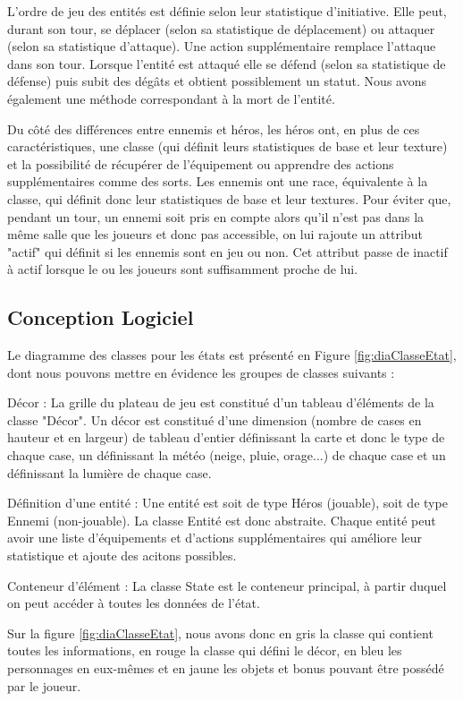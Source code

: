 \documentclass[a4paper,12pt]{article}
\begin{document}
L'ordre de jeu des entités est définie selon leur statistique d'initiative. Elle peut, durant son tour, se déplacer (selon sa statistique de déplacement) ou attaquer (selon sa statistique d'attaque). Une action supplémentaire remplace l'attaque dans son tour. Lorsque l'entité est attaqué elle se défend (selon sa statistique de défense) puis subit des dégâts et obtient possiblement un statut. Nous avons également une méthode correspondant à la mort de l'entité.

Du côté des différences entre ennemis et héros, les héros ont, en plus de ces caractéristiques, une classe (qui définit leurs statistiques de base et leur texture) et la possibilité de récupérer de l'équipement ou apprendre des actions supplémentaires comme des sorts. Les ennemis ont une race, équivalente à la classe, qui définit donc leur statistiques de base et leur textures. Pour éviter que, pendant un tour, un ennemi soit pris en compte alors qu'il n'est pas dans la même salle que les joueurs et donc pas accessible, on lui rajoute un attribut "actif" qui définit si les ennemis sont en jeu ou non. Cet attribut passe de inactif à actif lorsque le ou les joueurs sont suffisamment proche de lui.


\subsection{Conception Logiciel}

Le diagramme des classes pour les états est présenté en Figure \ref{fig:diaClasseEtat}, dont nous pouvons mettre en évidence les groupes de classes suivants :

Décor : La grille du plateau de jeu est constitué d'un tableau d'éléments de la classe "Décor". Un décor est constitué d'une dimension (nombre de cases en hauteur et en largeur) de tableau d'entier définissant la carte et donc le type de chaque case, un définissant la météo (neige, pluie, orage...) de chaque case et un définissant la lumière de chaque case.

Définition d'une entité : Une entité est soit de type Héros (jouable), soit de type Ennemi (non-jouable). La classe Entité est donc abstraite. Chaque entité peut avoir une liste d'équipements et d'actions supplémentaires qui améliore leur statistique et ajoute des acitons possibles.

Conteneur d’élément :  La classe State est le conteneur principal, à partir duquel on peut accéder à toutes les données de l’état.

Sur la figure \ref{fig:diaClasseEtat}, nous avons donc en gris la classe qui contient toutes les informations, en rouge la classe qui défini le décor, en bleu les personnages en eux-mêmes et en jaune les objets et bonus pouvant être possédé par le joueur.
\end{document}
